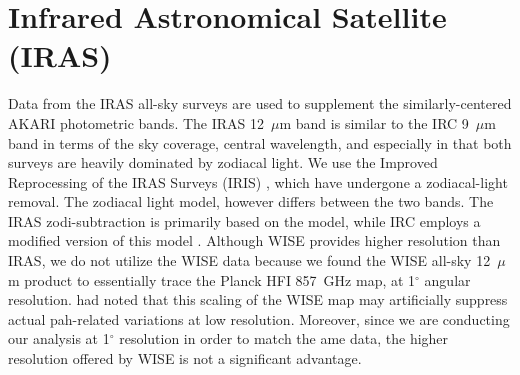     \section{Infrared Astronomical Satellite (IRAS)}
       Data from the IRAS \citep{iras84} all-sky surveys are used to supplement the similarly-centered AKARI photometric bands. The IRAS 12~$\mu$m band is similar to the IRC 9~$\mu$m band in terms of the sky coverage, central wavelength, and especially in that both surveys are heavily dominated by zodiacal light. We use the Improved Reprocessing of the IRAS Surveys (IRIS) \citep{iris05}, which have undergone a zodiacal-light removal. The zodiacal light model, however differs between the two bands. The IRAS zodi-subtraction is primarily based on the \cite{kelsall98} model, while IRC employs a modified version of this model \citep{kondo16}. Although WISE provides higher resolution than IRAS, we do not utilize the WISE data because we found the WISE all-sky 12~$\mu$m product to essentially trace the Planck HFI 857~GHz map, at 1$^{\circ}$ angular resolution. \cite{hensley16} had noted that this scaling of the WISE map may artificially suppress actual \acrshort{pah}-related variations at low resolution. Moreover, since we are conducting our analysis at 1$^{\circ}$ resolution in order to match the \acrshort{ame} data, the higher resolution offered by WISE is not a significant advantage.

